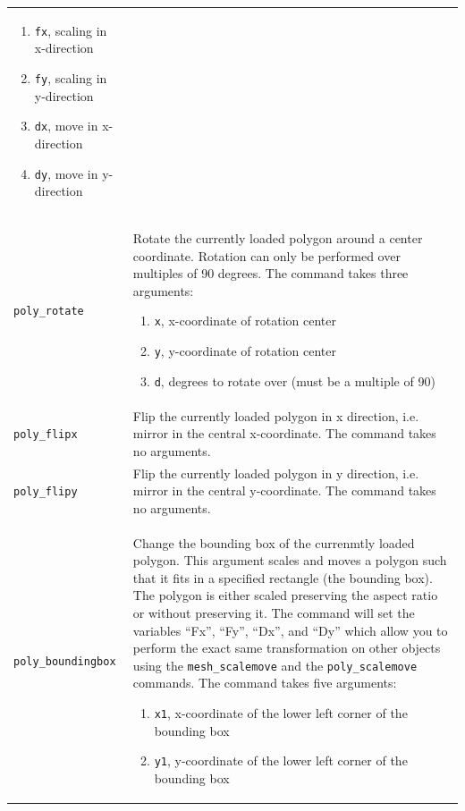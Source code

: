 \documentclass[noshowpacs,preprintnumbers,amsmath,amssymb, letter]{revtex4}
\begin{document}
\begin{longtable}{p{}p{}}
\begin{enumerate}
\item \texttt{fx}, scaling in x-direction
\item \texttt{fy}, scaling in y-direction
\item \texttt{dx}, move in x-direction
\item \texttt{dy}, move in y-direction
\end{enumerate}\\
\texttt{poly\_rotate} 	& Rotate the currently loaded polygon around a center coordinate. Rotation can only be performed over multiples of 90 degrees. The command takes three arguments:
\begin{enumerate}
\item \texttt{x}, x-coordinate of rotation center
\item \texttt{y}, y-coordinate of rotation center
\item \texttt{d}, degrees to rotate over (must be a multiple of 90)
\end{enumerate}\\
\texttt{poly\_flipx} 	& Flip the currently loaded polygon in x direction, i.e. mirror in the central x-coordinate. The command takes no arguments.\\
\texttt{poly\_flipy} 	& Flip the currently loaded polygon in y direction, i.e. mirror in the central y-coordinate. The command takes no arguments.\\
\texttt{poly\_boundingbox} 	& Change the bounding box of the currenmtly loaded polygon. This argument scales and moves a polygon such that it fits in a specified rectangle (the bounding box). The polygon is either scaled preserving the aspect ratio or without preserving it. The command will set the variables ``Fx'', ``Fy'', ``Dx'', and ``Dy'' which allow you to perform the exact same transformation on other objects using the \texttt{mesh\_scalemove} and the \texttt{poly\_scalemove} commands. The command takes five arguments:
\begin{enumerate}
\item \texttt{x1}, x-coordinate of the lower left corner of the bounding box
\item \texttt{y1}, y-coordinate of the lower left corner of the bounding box

\end{enumerate}
\end{longtable}
\end{document}
